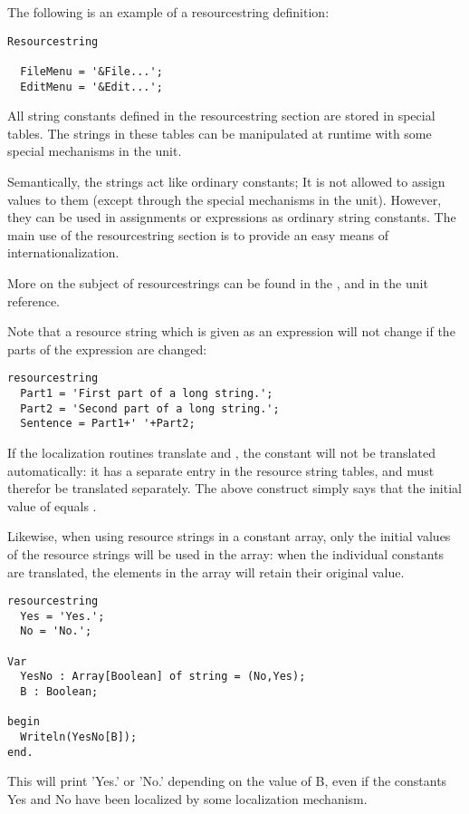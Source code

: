 The following is an example of a resourcestring definition:
\begin{verbatim}
Resourcestring

  FileMenu = '&File...';
  EditMenu = '&Edit...';
\end{verbatim}
All string constants defined in the resourcestring section are stored
in special tables. The strings in these tables can be manipulated
at runtime with some special mechanisms in the  unit.

Semantically, the strings act like ordinary constants; It is not allowed
to assign values to them (except through the special mechanisms in the 
 unit). However, they can be used in assignments or expressions as 
ordinary string constants. The main use of the resourcestring section is 
to provide an easy means of internationalization.

More on the subject of resourcestrings can be found in the \progref, and
in the  unit reference.

\begin{remark}
Note that a resource string which is given as an expression will not change if
the parts of the expression are changed:
\begin{verbatim}
resourcestring
  Part1 = 'First part of a long string.';
  Part2 = 'Second part of a long string.';
  Sentence = Part1+' '+Part2;
\end{verbatim}
If the localization routines translate  and , the
 constant will not be translated automatically: it has a
separate entry in the resource string tables, and must therefor be
translated separately. The above construct simply says that the 
initial value of  equals .
\end{remark}

\begin{remark}
Likewise, when using resource strings in a constant array, only the initial
values of the resource strings will be used in the array: when the
individual constants are translated, the elements in the array will retain
their original value.
\begin{verbatim}
resourcestring
  Yes = 'Yes.';
  No = 'No.';

Var
  YesNo : Array[Boolean] of string = (No,Yes);
  B : Boolean;

begin
  Writeln(YesNo[B]);
end.
\end{verbatim}
This will print 'Yes.' or 'No.' depending on the value of B, even if the 
constants Yes and No have been localized by some localization mechanism.
\end{remark}

